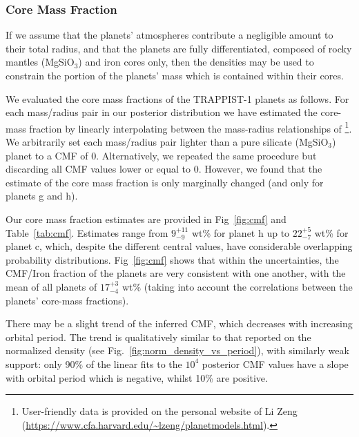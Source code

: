 \documentclass[twocolumn]{aastex63}
\begin{document}
\subsubsection{Core Mass Fraction}
\label{sec:subsection_CMF}

If we assume that the planets' atmospheres contribute a negligible
amount to their total radius, and that the planets are fully differentiated, composed of rocky mantles (MgSiO$_3$) and iron cores only, then the densities may be used to constrain the portion of the planets' mass which is contained within their cores.

We evaluated the core mass fractions of the TRAPPIST-1 planets as follows. For each mass/radius pair in our posterior distribution we have estimated the core-mass fraction by linearly interpolating between the mass-radius relationships of \citet{Zeng2016}\footnote{User-friendly data is provided on the personal website of Li Zeng (\url{https://www.cfa.harvard.edu/~lzeng/planetmodels.html}).}. We arbitrarily set each mass/radius pair lighter than a pure silicate (MgSiO$_3$) planet to a CMF of 0. Alternatively, we repeated the same procedure but discarding all CMF values lower or equal to 0. However, we found that the estimate of the core mass fraction is only marginally changed (and only for planets g and h).

Our core mass fraction estimates are provided in Fig~\ref{fig:cmf} and Table~\ref{tab:cmf}.  Estimates range from $9_{-9}^{+11}$ wt\% for planet h up to $22_{-7}^{+5}$ wt\% for planet c, which,  despite the different central values, have considerable overlapping probability distributions.
Fig~\ref{fig:cmf} shows that within the uncertainties, the CMF/Iron fraction of the planets are very consistent with one another, with the mean of all planets of $17_{-4}^{+3}$ wt\% (taking into account the correlations between the planets' core-mass fractions).

There may be a slight trend of the inferred CMF, which decreases with increasing orbital period. The trend is qualitatively similar to that reported on the normalized density (see Fig.~\ref{fig:norm_density_vs_period}), with similarly weak support: only 90\% of the linear fits to the $10^4$ posterior CMF values have a slope with orbital period which is negative, whilst 10\% are positive.
\end{document}
